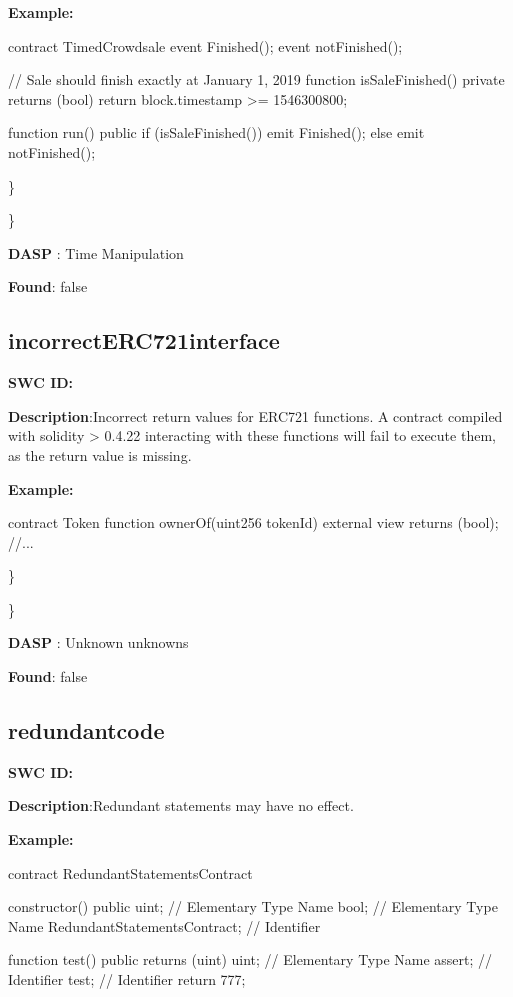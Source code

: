 \documentclass{article}
\begin{document}
{{\textbf{Example:} 

contract TimedCrowdsale
  event Finished();
  event notFinished();

  // Sale should finish exactly at January 1, 2019
  function isSaleFinished() private returns (bool) {
    return block.timestamp >= 1546300800;
  }

  function run() public {
    if (isSaleFinished()) {
        emit Finished();
    } else {
        emit notFinished();
    }
  }
}

\} 

\} 

\textbf{DASP} : Time Manipulation

\textbf{Found}: false

\subsection{incorrect\textunderscore ERC721\textunderscore interface} 
\textbf{SWC \textunderscore ID:} 

\textbf{Description}:Incorrect return values for ERC721 functions. A contract compiled with solidity > 0.4.22 interacting with these functions will fail to execute them, as the return value is missing.


\textbf{Example:} 

contract Token{
    function ownerOf(uint256 \textunderscore tokenId) external view returns (bool);
    //...
}

\} 

\} 

\textbf{DASP} : Unknown unknowns

\textbf{Found}: false

\subsection{redundant\textunderscore code} 
\textbf{SWC \textunderscore ID:} 

\textbf{Description}:Redundant statements may have no effect.


\textbf{Example:} 

contract RedundantStatementsContract {

    constructor() public {
        uint; // Elementary Type Name
        bool; // Elementary Type Name
        RedundantStatementsContract; // Identifier
    }

    function test() public returns (uint) {
        uint; // Elementary Type Name
        assert; // Identifier
        test; // Identifier
        return 777;
    }
}

}
\end{document}

